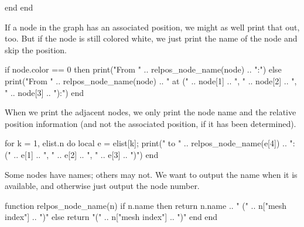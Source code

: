   end
end

\nwendcode{}\nwdocspar

If a node in the graph has an associated position, we might as 
well print that out, too.  But if the node is still colored white,
we just print the name of the node and skip the position.

\nwenddocs{}\endmoddef
if node.color == 0 then
  print("From " .. relpos_node_name(node) .. ":")
else
  print("From " .. relpos_node_name(node) .. " at ("
        .. node[1] .. ", "
        .. node[2] .. ", "
        .. node[3] .. "):")
end
\nwendcode{}\nwdocspar

When we print the adjacent nodes, we only print the node
name and the relative position information (and not the
associated position, if it has been determined).

\nwenddocs{}\endmoddef
for k = 1, elist.n do
  local e = elist[k];
  print("  to " .. relpos_node_name(e[4]) .. ": (" ..
        e[1] .. ", " ..
        e[2] .. ", " .. 
        e[3] .. ")")
end
\nwendcode{}\nwdocspar

Some nodes have names; others may not.  We want to output the name
when it is available, and otherwise just output the node number.

\nwenddocs{}\plusendmoddef
function relpos_node_name(n)
  if n.name then
    return n.name .. " (" .. n["mesh index"] .. ")"
  else
    return "(" .. n["mesh index"] .. ")"
  end
end

\nwendcode{}

%
%
%
%
%
%
%
%
\nwdocspar
\nwenddocs{}
